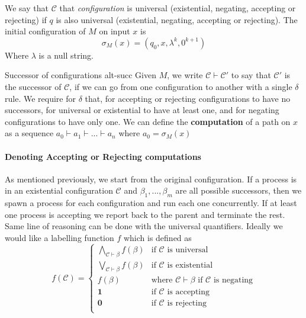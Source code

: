 We say that $\mathcal{C}$ that \textit{configuration} is universal (existential, negating, accepting or rejecting) if $q$ is also universal
(existential, negating, accepting or rejecting). The initial configuration of $M$ on input $x$ is
$$
    \sigma_M(x) = (q_0, x, \lambda^k, 0^{k+1})
$$
Where $\lambda$ is a null string.

\begin{definitionbox}{Successor of configurations \cite{chandra1981alternation}}{alt-succ}
    \label{def:alt-succ}
    Given $M$, we write $\mathcal{C} \vdash \mathcal{C'}$ to say that $\mathcal{C'}$ is the successor of
    $\mathcal{C}$, if we can go from one configuration to another with a single $\delta$ rule.
    We require for $\delta$ that, for accepting or rejecting configurations to have no successors,
    for universal or existential to have at least one, and for negating configurations to have only one.
    We can define the \textbf{computation} of a path on $x$ as a sequence
    $a_0 \vdash a_1 \vdash ... \vdash a_n$ where $a_0 = \sigma_M(x)$
\end{definitionbox}

\paragraph{Denoting Accepting or Rejecting computations}
As mentioned previously, we start from the original configuration. If a process
is in an existential configuration $\mathcal{C}$ and $\beta_1, ..., \beta_m$ are all
possible successors, then we spawn a process for each configuration and run each one concurrently.
If at least one process is accepting we report back to the parent and terminate the rest. Same line of reasoning can be done with
the universal quantifiers. Ideally we would like a labelling function $f$ which is defined as
$$
    f(\mathcal{C}) = \begin{cases}
        \bigwedge_{\mathcal{C} \vdash \beta} f(\beta) & \text{if }\mathcal{C} \text{ is universal}                                        \\
        \bigvee_{\mathcal{C} \vdash \beta} f(\beta)   & \text{if }\mathcal{C} \text{ is existential}                                      \\
        f(\beta)                                      & \text{where }\mathcal{C} \vdash \beta \text{ if } \mathcal{C} \text{ is negating} \\
        \mathbf{1}                                    & \text{if } \mathcal{C} \text{ is accepting}                                       \\
        \mathbf{0}                                    & \text{if } \mathcal{C} \text{ is rejecting}                                       \\
    \end{cases}
$$

